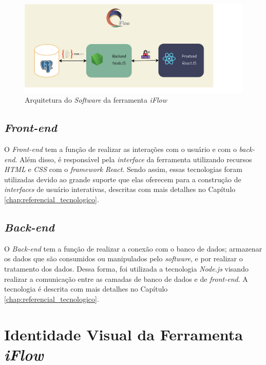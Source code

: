\begin{figure}[]
    \begin{center}
        \caption{{Arquitetura do \textit{Software} da ferramenta \textit{iFlow}}}
        \label{fig:arquitetura}
        \includegraphics[scale=1.0]{figuras/Proposta/arquitetura.png}
    \end{center}
\end{figure}

\subsection{\textit{Front-end}}
O \textit{Front-end} tem a função de realizar as interações com o usuário e com o \textit{back-end}. Além disso, é responsável pela \textit{interface} da ferramenta utilizando recursos \textit{HTML} e \textit{CSS} com o \textit{framework} \textit{React}. Sendo assim, essas tecnologias foram utilizadas devido ao grande suporte que elas oferecem para a construção de \textit{interfaces} de usuário interativas, descritas com mais detalhes no Capítulo \ref{chap:referencial_tecnologico}.

\subsection{\textit{Back-end}}
O \textit{Back-end} tem a função de realizar a conexão com o banco de dados; armazenar os dados que são consumidos ou manipulados pelo \textit{software}, e por realizar o tratamento dos dados. Dessa forma, foi utilizada a tecnologia \textit{Node.js} visando realizar a comunicação entre as camadas de banco de dados e de \textit{front-end}. A tecnologia é descrita com mais detalhes no Capítulo \ref{chap:referencial_tecnologico}.

\section{Identidade Visual da Ferramenta \textit{iFlow}}

